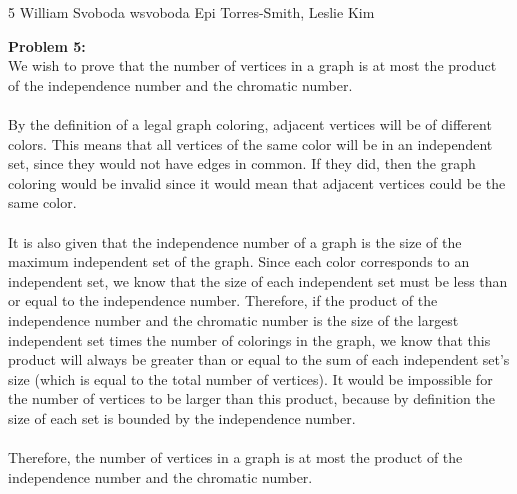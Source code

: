 \documentclass[12pt,letterpaper]{cos340hw}
\begin{document}
           {5}            %
           {William Svoboda}  %
           {wsvoboda}   %
           {Epi Torres-Smith, Leslie Kim} 




\noindent\textbf{Problem 5:}\\
We wish to prove that the number of vertices in a graph is at most the product of the independence 
number and the chromatic number.\\\\
By the definition of a legal graph coloring, adjacent vertices will be of different colors. This means that 
all vertices of the same color will be in an independent set, since they would not have edges in common. 
If they did, then the graph coloring would be invalid since it would mean that adjacent vertices could be 
the same color.\\\\
It is also given that the independence number of a graph is the size of the maximum independent set of 
the graph. Since each color corresponds to an independent set, we know that the size of each independent 
set must be less than or equal to the independence number. Therefore, if the product of the independence number 
and the chromatic number is the size of the largest independent set times the number of colorings in the graph, 
we know that this product will always be greater than or equal to the sum of each independent set's size (which 
is equal to the total number of vertices). It would be impossible for the number of vertices to be larger than this 
product, because by definition the size of each set is bounded by the independence number.\\\\
Therefore, the number of vertices in a graph is at most the product of the independence number and the 
chromatic number.


\end{document}
